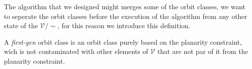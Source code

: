 The algorithm that we designed might merges some of the orbit classes, we want to seperate the orbit classes before 
the execution of the algorithm from any other state of the $\mathcal{V}/\sim$, for this reason we introduce this definition. 

\begin{definition}
    A \textit{first-gen} orbit class is an orbit class purely based on the planarity constraint, wich is not contaminated 
    with other elements of $\mathcal{V}$ that are not par of it from the planarity constraint.
\end{definition}


